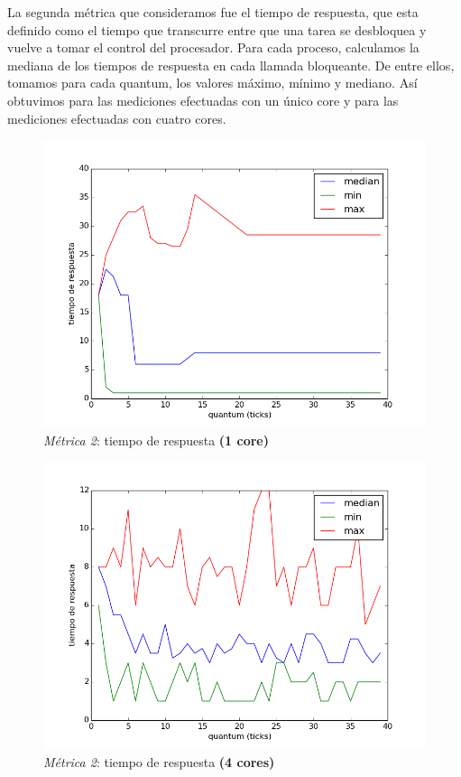 \documentclass[11pt, a4paper, twoside]{article}
\begin{document}
La segunda métrica que consideramos fue el tiempo de respuesta, que esta definido como el tiempo que 
transcurre entre que una tarea se desbloquea y vuelve a tomar el control del procesador. Para cada proceso,
calculamos la mediana de los tiempos de respuesta en cada llamada bloqueante. De entre ellos, tomamos 
para cada quantum, los valores máximo, mínimo y mediano. Así obtuvimos  para las 
mediciones efectuadas con un único core y  para las mediciones efectuadas con cuatro
cores. 

\begin{figure}
  \centering
  \includegraphics [width=\textwidth]{../codigo/plot-respuesta-muybueno.png}
  \caption{\emph{Métrica 2}: tiempo de respuesta \textbf{(1 core)}}
  \label{fig:metrica-gonza-1core}
\end{figure}

\begin{figure}
  \centering
  \includegraphics [width=\textwidth]{../codigo/plot-respuesta-4core-unpocomejor.png}
  \caption{\emph{Métrica 2}: tiempo de respuesta \textbf{(4 cores)}}
  \label{fig:metrica-gonza-4cores}
\end{figure}
\end{document}
